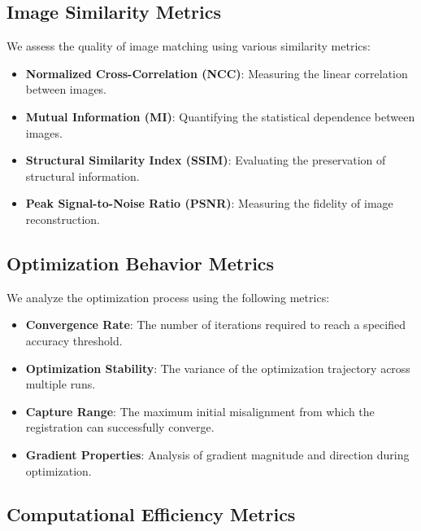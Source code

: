 \subsection{Image Similarity Metrics}

We assess the quality of image matching using various similarity metrics:

\begin{itemize}
    \item \textbf{Normalized Cross-Correlation (NCC)}: Measuring the linear correlation between images.
    
    \item \textbf{Mutual Information (MI)}: Quantifying the statistical dependence between images.
    
    \item \textbf{Structural Similarity Index (SSIM)}: Evaluating the preservation of structural information.
    
    \item \textbf{Peak Signal-to-Noise Ratio (PSNR)}: Measuring the fidelity of image reconstruction.
\end{itemize}

\subsection{Optimization Behavior Metrics}

We analyze the optimization process using the following metrics:

\begin{itemize}
    \item \textbf{Convergence Rate}: The number of iterations required to reach a specified accuracy threshold.
    
    \item \textbf{Optimization Stability}: The variance of the optimization trajectory across multiple runs.
    
    \item \textbf{Capture Range}: The maximum initial misalignment from which the registration can successfully converge.
    
    \item \textbf{Gradient Properties}: Analysis of gradient magnitude and direction during optimization.
\end{itemize}

\subsection{Computational Efficiency Metrics}


